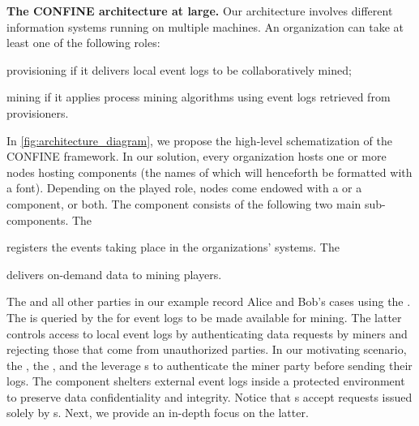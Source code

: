 \noindent\textbf{The CONFINE architecture at large.}
Our architecture involves different information systems running on multiple machines. An organization can take at least one of the following roles: 
\begin{inparadesc}
\item[provisioning] if it delivers local event logs to be collaboratively mined;
\item[mining] if it applies process mining algorithms using event logs retrieved from provisioners.
\end{inparadesc}
In \cref{fig:architecture_diagram}, we propose the high-level schematization of the CONFINE framework.
In our solution, every organization hosts one or more nodes hosting components (the names of which will henceforth be formatted with a  font). Depending on the played role, nodes come endowed with a  or a  component, or both. The  component consists of the following two main sub-components. The \begin{inparadesc}
\item[\Compo{Log Recorder}] registers the events taking place in the organizations' systems. The
\item[\Compo{Log Provider}] delivers on-demand data to mining players.
\end{inparadesc}
The  and all other parties in our example record Alice and Bob's cases using the . The  is queried by the  for event logs to be made available for mining. The latter controls access to local event logs by authenticating data requests by miners and rejecting those that come from unauthorized parties.
In our motivating scenario, the , the , and the  leverage s to authenticate the miner party before sending their logs.  The  component
shelters external event logs inside a protected environment to preserve data confidentiality and integrity.
Notice that s accept requests issued solely by s. 
Next, we provide an in-depth focus on the latter.

